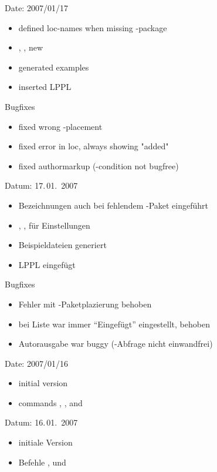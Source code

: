 \ifENGLISH
 Date: 2007/01/17
 \begin{itemize}
	\item defined loc-names when missing -package
	\item {}, ,  new
	\item generated examples
	\item inserted LPPL
 \end{itemize}
 Bugfixes
 \begin{itemize}
	\item fixed wrong -placement
	\item fixed error in loc, always showing "added"
	\item fixed authormarkup (-condition not bugfree)
 \end{itemize}
\fi
	\ifGERMAN
	 Datum: 17.\,01.~2007
	 \begin{itemize}
		\item Bezeichnungen auch bei fehlendem -Paket eingeführt
		\item {}, ,  für Einstellungen
		\item Beispieldateien generiert
		\item LPPL eingefügt
	 \end{itemize}
	 Bugfixes
	 \begin{itemize}
		\item Fehler mit -Paketplazierung behoben
		\item bei Liste war immer "`Eingefügt"' eingestellt, behoben
		\item Autorausgabe war buggy (-Abfrage nicht einwandfrei)
	 \end{itemize}
	\fi


\ifENGLISH
 Date: 2007/01/16
 \begin{itemize}
	\item initial version
	\item commands , , and 
 \end{itemize}
\fi
	\ifGERMAN
	 Datum: 16.\,01.~2007
	 \begin{itemize}
		\item initiale Version
		\item Befehle ,  und 
	 \end{itemize}
	\fi

